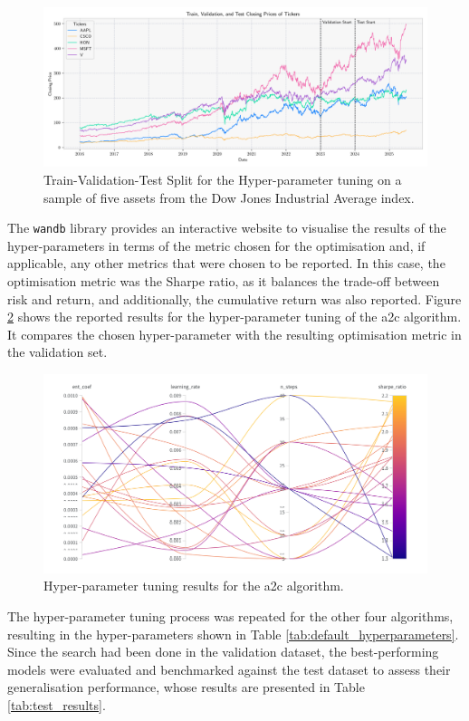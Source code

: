 \begin{figure}
    \centering
    \includegraphics[width=\textwidth]{figures/dataset_split.png}
    \caption{Train-Validation-Test Split for the Hyper-parameter tuning on a sample of five assets from the Dow Jones Industrial Average index.}
    \label{fig:dataset_split}
\end{figure}

The \texttt{wandb} library provides an interactive website to visualise the results of the hyper-parameters in terms of the metric chosen for the optimisation and, if applicable, any other metrics that were chosen to be reported. In this case, the optimisation metric was the Sharpe ratio, as it balances the trade-off between risk and return, and additionally, the cumulative return was also reported. Figure \ref{fig:a2c_hyperparameter_tuning} shows the reported results for the hyper-parameter tuning of the \acrshort{a2c} algorithm. It compares the chosen hyper-parameter with the resulting optimisation metric in the validation set.

\begin{figure}
\centering
\includegraphics[width=\textwidth]{figures/a2c_hyperparameter_tuning.png}
\caption{Hyper-parameter tuning results for the \acrshort{a2c} algorithm.}
\label{fig:a2c_hyperparameter_tuning}
\end{figure}

The hyper-parameter tuning process was repeated for the other four algorithms, resulting in the hyper-parameters shown in Table \ref{tab:default_hyperparameters}. Since the search had been done in the validation dataset, the best-performing models were evaluated and benchmarked against the test dataset to assess their generalisation performance, whose results are presented in Table \ref{tab:test_results}.


